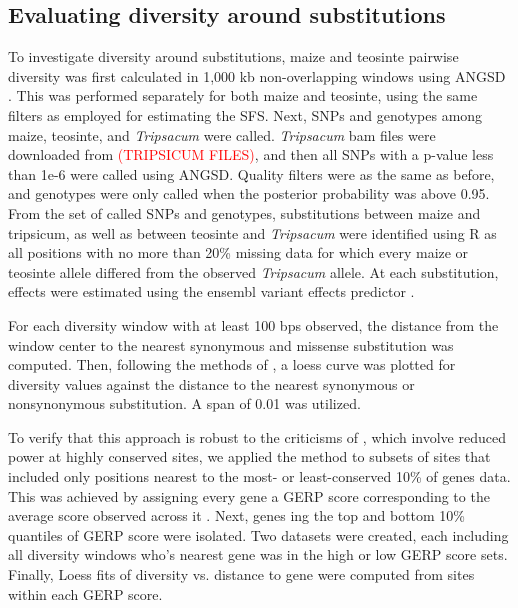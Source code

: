 \documentclass{pnastwo}
\begin{document}
\begin{article}
\begin{materials}
\subsection{Evaluating diversity around substitutions}
To investigate diversity around substitutions, maize and teosinte pairwise diversity was first
calculated in 1,000 kb non-overlapping windows using ANGSD
\cite{korneliussen2014}. This was performed separately for both maize and
teosinte, using the same filters as employed for estimating the
SFS. Next, SNPs and genotypes among maize, teosinte, and \emph{Tripsacum} were called. \emph{Tripsacum} bam files
were downloaded from \textcolor{red}{(TRIPSICUM FILES)}, and then all SNPs with a
p-value less than 1e-6 were called using ANGSD. Quality filters were
as the same as before, and genotypes were only called when the
posterior probability was above 0.95. From the set of called SNPs and
genotypes, substitutions between maize and tripsicum, as well as
between teosinte and \emph{Tripsacum} were identified using R \cite{R2014} as all positions with
no more than 20\% missing data for which every maize or teosinte
allele differed from the observed \emph{Tripsacum} allele. At each
substitution, effects were estimated using the ensembl variant effects
predictor \cite{mclaren2010}.

For each diversity window with at least 100 bps observed, the distance from the window center to the
nearest synonymous and missense substitution was
computed. Then, following the methods of \cite{hernandez2011}, a loess
curve was plotted for diversity values against the distance to the
nearest synonymous or nonsynonymous substitution. A span of 0.01 was
utilized.

To verify that this approach is robust to the criticisms of \cite{enard2014}, which involve reduced power at highly conserved sites, we applied the method to subsets of sites that included only positions nearest to the  most- or least-conserved 10\% of genes data. This was achieved by assigning every gene a GERP score corresponding to the average score observed across it \cite{rodgers2015}. Next, genes ing the top and bottom 10\% quantiles of GERP score were isolated. Two datasets were created, each including all diversity windows who's nearest gene was in the high or low GERP score sets. Finally, Loess fits of diversity vs. distance to gene were computed from sites within each GERP score.




\end{materials}
\end{article}
\end{document}
